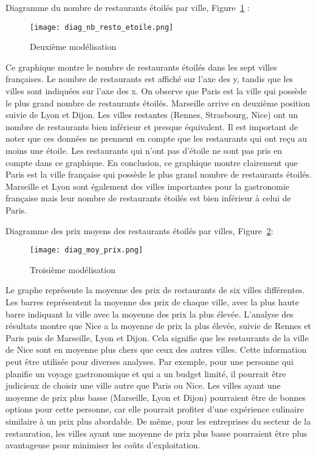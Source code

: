 \documentclass[mstat,12pt]{unswthesis}
\begin{document}
Diagramme du nombre de restaurants étoilés par ville, Figure
\(~\)\ref{diag2} :

\begin{figure}
\hypertarget{diag2}{%
\centering
\texttt{[image: diag\_nb\_resto\_etoile.png]}
\caption{Deuxième modélisation}\label{diag2}
}
\end{figure}

\bigskip
\bigskip

Ce graphique montre le nombre de restaurants étoilés dans les sept
villes françaises. Le nombre de restaurants est affiché sur l'axe des y,
tandis que les villes sont indiquées sur l'axe des x. On observe que
Paris est la ville qui possède le plus grand nombre de restaurants
étoilés. Marseille arrive en deuxième position suivie de Lyon et Dijon.
Les villes restantes (Rennes, Strasbourg, Nice) ont un nombre de
restaurants bien inférieur et presque équivalent. Il est important de
noter que ces données ne prennent en compte que les restaurants qui ont
reçu au moins une étoile. Les restaurants qui n'ont pas d'étoile ne sont
pas pris en compte dans ce graphique. En conclusion, ce graphique montre
clairement que Paris est la ville française qui possède le plus grand
nombre de restaurants étoilés. Marseille et Lyon sont également des
villes importantes pour la gastronomie française mais leur nombre de
restaurants étoilés est bien inférieur à celui de Paris.

\bigskip

Diagramme des prix moyens des restaurants étoilés par villes, Figure
\(~\)\ref{diag3}:

\begin{figure}
\hypertarget{diag3}{%
\centering
\texttt{[image: diag\_moy\_prix.png]}
\caption{Troisième modélisation}\label{diag3}
}
\end{figure}

\bigskip

Le graphe représente la moyenne des prix de restaurants de six villes
différentes. Les barres représentent la moyenne des prix de chaque
ville, avec la plus haute barre indiquant la ville avec la moyenne des
prix la plus élevée. L'analyse des résultats montre que Nice a la
moyenne de prix la plus élevée, suivie de Rennes et Paris puis de
Marseille, Lyon et Dijon. Cela signifie que les restaurants de la ville
de Nice sont en moyenne plus chers que ceux des autres villes. Cette
information peut être utilisée pour diverses analyses. Par exemple, pour
une personne qui planifie un voyage gastronomique et qui a un budget
limité, il pourrait être judicieux de choisir une ville autre que Paris
ou Nice. Les villes ayant une moyenne de prix plus basse (Marseille,
Lyon et Dijon) pourraient être de bonnes options pour cette personne,
car elle pourrait profiter d'une expérience culinaire similaire à un
prix plus abordable. De même, pour les entreprises du secteur de la
restauration, les villes ayant une moyenne de prix plus basse pourraient
être plus avantageuse pour minimiser les coûts d'exploitation.
\end{document}
